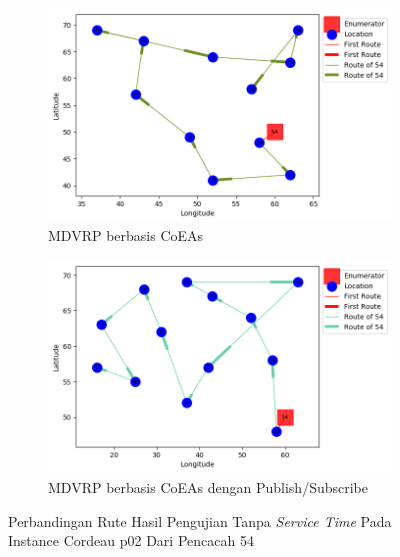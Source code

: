 \begin{figure}[H]
	\centering
	\begin{subfigure}[t]{\textwidth}
		\centering
		\includegraphics[width=\textwidth]{Resources/Images/cordeau_p02/cordeau_p02_notw_54_coes}
		\caption{MDVRP berbasis CoEAs}
		\label{fig:cordeau_p02_notw_54_coes}
	\end{subfigure}
	\begin{subfigure}[t]{\textwidth}
		\centering
		\includegraphics[width=\textwidth]{Resources/Images/cordeau_p02/cordeau_p02_notw_54_pubsub_coes}
		\caption{MDVRP berbasis CoEAs dengan Publish/Subscribe}
		\label{fig:cordeau_p02_notw_54_pubsub_coes}
	\end{subfigure}
	\caption{Perbandingan Rute Hasil Pengujian Tanpa \textit{Service Time} Pada Instance Cordeau p02 Dari Pencacah 54}
	\label{fig:cordeau_p02_notw_54}
\end{figure}


